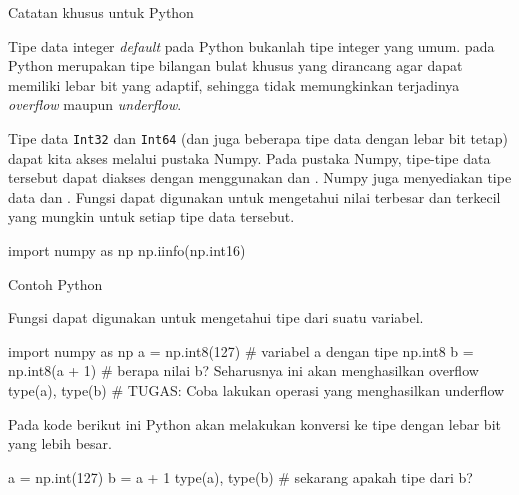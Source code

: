 \begin{frame}[fragile]{Catatan khusus untuk Python}

Tipe data integer \textit{default} pada Python bukanlah tipe integer yang umum.
 pada Python merupakan tipe bilangan bulat khusus yang dirancang agar dapat
memiliki lebar bit yang adaptif, sehingga tidak memungkinkan terjadinya
\textit{overflow} maupun \textit{underflow}.

Tipe data \texttt{Int32} dan \texttt{Int64} (dan juga beberapa tipe data dengan lebar bit
tetap) dapat kita akses melalui pustaka Numpy. Pada pustaka Numpy, tipe-tipe data
tersebut dapat diakses dengan menggunakan  dan .
Numpy juga menyediakan tipe data  dan .
Fungsi  dapat digunakan untuk mengetahui nilai terbesar
dan terkecil yang mungkin untuk setiap tipe data tersebut.

\begin{pythoncode}
import numpy as np
np.iinfo(np.int16)
\end{pythoncode}

\end{frame}




\begin{frame}[fragile]{Contoh Python}

Fungsi  dapat digunakan untuk mengetahui tipe dari suatu
variabel.

\begin{pythoncode}
import numpy as np
a = np.int8(127) # variabel a dengan tipe np.int8
b = np.int8(a + 1) # berapa nilai b? Seharusnya ini akan menghasilkan overflow
type(a), type(b)
# TUGAS: Coba lakukan operasi yang menghasilkan underflow
\end{pythoncode}

Pada kode berikut ini Python akan melakukan konversi ke tipe dengan lebar bit
yang lebih besar.
\begin{pythoncode}
a = np.int(127)
b = a + 1
type(a), type(b) # sekarang apakah tipe dari b?
\end{pythoncode}

\end{frame}



